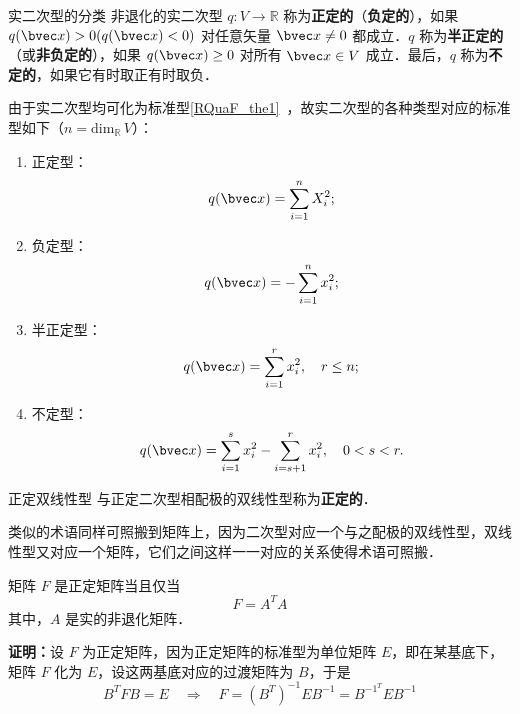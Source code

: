 \begin{definition}{实二次型的分类}
非退化的实二次型 $q:V\rightarrow\mathbb R$ 称为\textbf{正定的}（\textbf{负定的}），如果 $q(\bvec x)>0(q(\bvec x)<0)$ 对任意矢量 $\bvec x\neq0$ 都成立．$q$ 称为\textbf{半正定的}（或\textbf{非负定的}），如果 $q(\bvec x)\geq0$ 对所有 $\bvec x\in V$ 成立．最后，$q$ 称为\textbf{不定的}，如果它有时取正有时取负．
\end{definition}
由于实二次型均可化为标准型\autoref{RQuaF_the1}~，故实二次型的各种类型对应的标准型如下（$n=\mathrm{dim}_\mathbb R \,V$）：
\begin{enumerate}
\item 正定型：\begin{equation}
q(\bvec x)=\sum_{i=1}^n X_i^2;
\end{equation}
\item 负定型：\begin{equation}
q(\bvec x)=-\sum_{i=1}^n x_i^2;
\end{equation}
\item 半正定型：\begin{equation}
q(\bvec x)=\sum_{i=1}^r x_i^2,\quad r\leq n;
\end{equation}
\item 不定型：\begin{equation}
q(\bvec x)=\sum_{i=1}^s x_i^2-\sum_{i=s+1}^r x_i^2,\quad0<s< r.
\end{equation}
\end{enumerate}
\begin{definition}{正定双线性型}
与正定二次型相配极的双线性型称为\textbf{正定的}．
\end{definition}
类似的术语同样可照搬到矩阵上，因为二次型对应一个与之配极的双线性型，双线性型又对应一个矩阵，它们之间这样一一对应的关系使得术语可照搬．
\begin{theorem}{}
矩阵 $F$ 是正定矩阵当且仅当
\begin{equation}
F=A^TA
\end{equation}
其中，$A$ 是实的非退化矩阵．
\end{theorem}
\textbf{证明：}设 $F$ 为正定矩阵，因为正定矩阵的标准型为单位矩阵 $E$，即在某基底下，矩阵 $F$ 化为 $E$，设这两基底对应的过渡矩阵为 $B$，于是
\begin{equation}
B^TFB=E\quad\Rightarrow\quad F=(B^T)^{-1}EB^{-1}=B^{-1}^TEB^{-1}
\end{equation}
